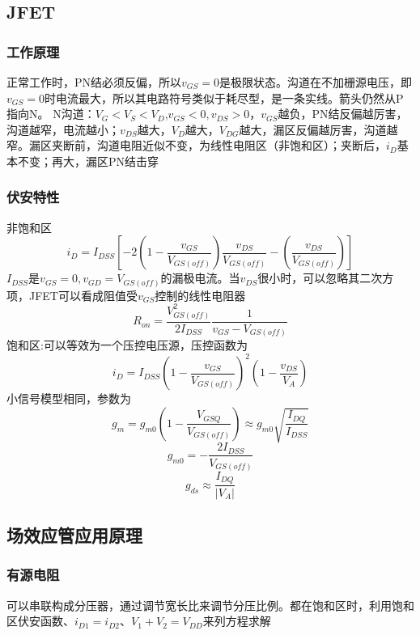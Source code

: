 \documentclass{ctexart}
\begin{document}
\subsection{JFET}
\subsubsection{工作原理}
正常工作时，PN结必须反偏，所以$v_{GS}=0$是极限状态。沟道在不加栅源电压，即$v_{GS}=0$时电流最大，所以其电路符号类似于耗尽型，是一条实线。箭头仍然从P指向N。
N沟道：$V_G<V_S<V_D$,$v_{GS}<0,v_{DS}>0$，$v_{GS}$越负，PN结反偏越厉害，沟道越窄，电流越小；$v_{DS}$越大，$V_D$越大，$V_{DG}$越大，漏区反偏越厉害，沟道越窄。漏区夹断前，沟道电阻近似不变，为线性电阻区（非饱和区）；夹断后，$i_D$基本不变；再大，漏区PN结击穿
\subsubsection{伏安特性}
非饱和区
\begin{equation}
    i_D=I_{DSS}\left[ -2(1-\dfrac{v_{GS}}{V_{GS(off)}})\dfrac{v_{DS}}{V_{GS(off)}}-(\dfrac{v_{DS}}{V_{GS(off)}}) \right]
\end{equation}
$I_{DSS}$是$v_{GS}=0,v_{GD}=V_{GS(off)}$的漏极电流。当$v_{DS}$很小时，可以忽略其二次方项，JFET可以看成阻值受$v_{GS}$控制的线性电阻器
\begin{equation}
    R_{on}=\dfrac{V_{GS(off)}^2}{2I_{DSS}}\dfrac{1}{v_{GS}-V_{GS(off)}}
\end{equation}
饱和区:可以等效为一个压控电压源，压控函数为
\begin{equation}
    i_D=I_{DSS}(1-\dfrac{v_{GS}}{V_{GS(off)}})^2(1-\dfrac{v_{DS}}{V_A})
\end{equation}
小信号模型相同，参数为
\begin{equation}
    g_m=g_{m0}(1-\dfrac{V_{GSQ}}{V_{GS(off)}})\approx g_{m0}\sqrt{\dfrac{I_{DQ}}{I_{DSS}}}
\end{equation}
\begin{equation}
    g_{m0}=-\dfrac{2I_{DSS}}{V_{GS(off)}}
\end{equation}
\begin{equation}
    g_{ds}\approx \dfrac{I_{DQ}}{|V_A|}
\end{equation}
\subsection{场效应管应用原理}
\subsubsection{有源电阻}
可以串联构成分压器，通过调节宽长比来调节分压比例。都在饱和区时，利用饱和区伏安函数、$i_{D1}=i_{D2}$、$V_1+V_2=V_{DD}$来列方程求解
\end{document}
